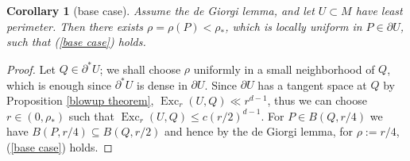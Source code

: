 \documentclass[reqno,11pt]{amsart}
\DeclareMathOperator{\Exc}{Exc}
\newtheorem{corollary}[theorem]{Corollary}
\theoremstyle{definition}
\numberwithin{equation}{section}
\begin{document}
\begin{corollary}[base case]
Assume the de Giorgi lemma, and let $U \subset M$ have least perimeter.
Then there exists $\rho = \rho(P) < \rho_*$, which is locally uniform in $P \in \partial U$, such that (\ref{base case}) holds.
\end{corollary}
\begin{proof}
Let $Q \in \partial^* U$; we shall choose $\rho$ uniformly in a small neighborhood of $Q$, which is enough since $\partial^* U$ is dense in $\partial U$.
Since $\partial U$ has a tangent space at $Q$ by Proposition \ref{blowup theorem}, $\Exc_r(U, Q) \ll r^{d - 1}$, thus we can choose $r \in (0, \rho_*)$ such that $\Exc_r(U, Q) \leq c(r/2)^{d - 1}$.
For $P \in B(Q, r/4)$ we have $B(P, r/4) \subseteq B(Q, r/2)$ and hence by the de Giorgi lemma, for $\rho := r/4$, (\ref{base case}) holds.
\end{proof}
\end{document}
